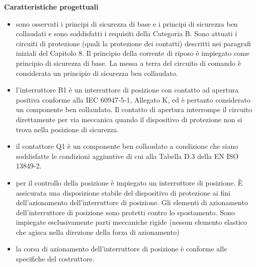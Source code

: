 \textbf{Caratteristiche progettuali}
\begin{itemize}
    \item sono osservati i principi di sicurezza di base e i principi di sicurezza ben collaudati e sono soddisfatti i requisiti della Categoria B. Sono attuati i circuiti di protezione (quali la protezione dei contatti) descritti nei paragrafi iniziali del Capitolo 8. Il principio della corrente di riposo è impiegato come principio di sicurezza di base. La messa a terra del circuito di comando è considerata un principio di sicurezza ben collaudato.
    \item l'interruttore B1 è un interruttore di posizione con contatto ad apertura positiva conforme alla IEC 60947-5-1, Allegato K, ed è pertanto considerato un componente ben collaudato. Il contatto di apertura interrompe il circuito direttamente per via meccanica quando il dispositivo di protezione non si trova nella posizione di sicurezza.
    \item il contattore Q1 è un componente ben collaudato a condizione che siano soddisfatte le condizioni aggiuntive di cui alla Tabella D.3 della EN ISO 13849-2.
    \item per il controllo della posizione è impiegato un interruttore di posizione. È assicurata una disposizione stabile del dispositivo di protezione ai fini dell'azionamento dell'interruttore di posizione. Gli elementi di azionamento dell'interruttore di posizione sono protetti contro lo spostamento. Sono impiegate esclusivamente parti meccaniche rigide (nessun elemento elastico che agisca nella direzione della forza di azionamento)
    \item la corsa di azionamento dell'interruttore di posizione è conforme alle specifiche del costruttore.
\end{itemize}

